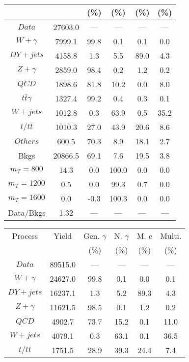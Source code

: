 \begin{figure}
\begin{minipage}[c]{0.32\textwidth}
{\begin{tabular}{cccccc}
 &  & (\%) & (\%) & (\%) & (\%)  \\
\hline
                                                                      $ Data $ &  27603.0 &  --- &  --- &  --- &  ---\\
$ W+\gamma $ &  7999.1 &  99.8 &  0.1 &  0.1 &  0.0\\
$ DY+jets $ &  4158.8 &  1.3 &  5.5 &  89.0 &  4.3\\
$ Z+\gamma $ &  2859.0 &  98.4 &  0.2 &  1.2 &  0.2\\
$ QCD $ &  1898.6 &  81.8 &  10.2 &  0.0 &  8.0\\
$ t\bar{t}\gamma $ &  1327.4 &  99.2 &  0.4 &  0.3 &  0.1\\
$ W+jets $ &  1012.8 &  0.3 &  63.9 &  0.5 &  35.2\\
$ t/t\bar{t} $ &  1010.3 &  27.0 &  43.9 &  20.6 &  8.6\\
$ Others $ &  600.5 &  70.3 &  8.9 &  18.1 &  2.7\\
Bkgs &  20866.5 &  69.1 &  7.6 &  19.5 &  3.8\\
$ m_{T} = 800 $ &  14.3 &  0.0 &  100.0 &  0.0 &  0.0\\
$ m_{T} = 1200 $ &  0.5 &  0.0 &  99.3 &  0.7 &  0.0\\
$ m_{T} = 1600 $ &  0.0 &  -0.3 &  100.3 &  0.0 &  0.0\\
Data/Bkgs &  1.32 &  --- &  --- &  --- &  ---\\
\hline
\end{tabular}
}
\end{minipage}
\begin{minipage}[c]{0.32\textwidth}
\centering
\tiny{
\begin{tabular}{cccccc}
\hline
Process & Yield & Gen. $\gamma$ & N. $\gamma$ & M. e & Multi. \\
 &  & (\%) & (\%) & (\%) & (\%)  \\
\hline
                                                                      $ Data $ &  89515.0 &  --- &  --- &  --- &  ---\\
$ W+\gamma $ &  24627.0 &  99.8 &  0.1 &  0.0 &  0.1\\
$ DY+jets $ &  16237.1 &  1.3 &  5.2 &  89.3 &  4.3\\
$ Z+\gamma $ &  11621.5 &  98.5 &  0.1 &  1.2 &  0.2\\
$ QCD $ &  4902.7 &  73.7 &  15.2 &  0.1 &  11.0\\
$ W+jets $ &  4079.1 &  0.3 &  63.1 &  0.1 &  36.5\\
$ t/t\bar{t} $ &  1751.5 &  28.9 &  39.3 &  24.4 &  7.4\\

\end{tabular}}
\end{minipage}
\end{figure}

